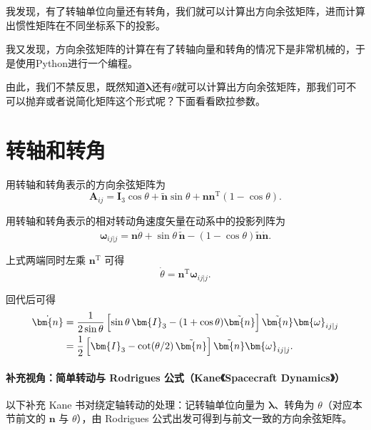 我发现，有了转轴单位向量还有转角，我们就可以计算出方向余弦矩阵，进而计算出惯性矩阵在不同坐标系下的投影。

    我又发现，方向余弦矩阵的计算在有了转轴向量和转角的情况下是非常机械的，于是使用Python进行一个编程。

    由此，我们不禁反思，既然知道$\bm{\lambda}$还有$\theta$就可以计算出方向余弦矩阵，那我们可不可以抛弃或者说简化矩阵这个形式呢？下面看看欧拉参数。
\newpage
\section{转轴和转角}\label{sec:simple-rotation}


用转轴和转角表示的方向余弦矩阵为
\begin{equation}
    \bm{A}_{ij} = \bm{I}_3 \cos\theta + \tilde{\bm{n}}\sin\theta + \bm{n}\bm{n}^{\mathrm{T}}(1-\cos\theta).
\end{equation}

用转轴和转角表示的相对转动角速度矢量在动系中的投影列阵为
\begin{equation}
    \bm{\omega}_{ij|j} = \bm{n}\dot{\theta} + \sin\theta\,\dot{\tilde{\bm{n}}} - (1-\cos\theta)\tilde{\bm{n}}\dot{\bm{n}}.
\end{equation}

上式两端同时左乘 $\bm{n}^{\mathrm{T}}$ 可得
\begin{equation}
    \dot{\theta} = \bm{n}^{\mathrm{T}}\bm{\omega}_{ij|j}.
\end{equation}

回代后可得
\begin{align}
    \dot{\bm{n}} &= \frac{1}{2\sin\theta}\left[\sin\theta\,\bm{I}_3 - (1+\cos\theta)\tilde{\bm{n}}\right]\tilde{\bm{n}}\bm{\omega}_{ij|j} \notag\\
    &= \frac{1}{2}\left[\bm{I}_3 - \cot(\theta/2)\,\tilde{\bm{n}}\right]\tilde{\bm{n}}\bm{\omega}_{ij|j}.
\end{align}

\paragraph*{补充视角：简单转动与 Rodrigues 公式（Kane《Spacecraft Dynamics》）}

以下补充 Kane 书对绕定轴转动的处理：记转轴单位向量为 $\bm{\lambda}$、转角为 $\theta$（对应本节前文的 $\bm{n}$ 与 $\theta$），由 Rodrigues 公式出发可得到与前文一致的方向余弦矩阵。

